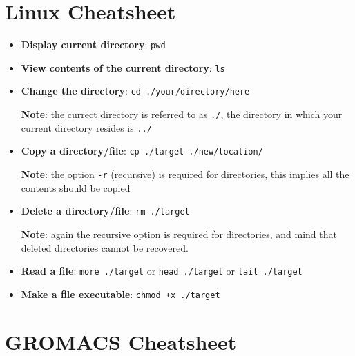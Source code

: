 \documentclass[]{article}
\begin{document}


\newpage

\appendix
\section*{Linux Cheatsheet}
\setlength\parindent{0pt}

\begin{itemize}
\item \textbf{Display current directory}: \texttt{pwd}

\item \textbf{View contents of the current directory}: \texttt{ls}

\item \textbf{Change the directory}: \texttt{cd ./your/directory/here}

\textbf{Note}: the currect directory is referred to as \texttt{./}, the directory in which your current directory resides is \texttt{../}

\item \textbf{Copy a directory/file}: \texttt{cp ./target ./new/location/}

\textbf{Note}: the option \texttt{-r} (recursive) is required for directories, this implies all the contents should be copied

\item \textbf{Delete a directory/file}: \texttt{rm ./target}

\textbf{Note}: again the recursive option is required for directories, and mind that deleted directories cannot be recovered.

\item \textbf{Read a file}: \texttt{more ./target} or \texttt{head ./target} or \texttt{tail ./target}

\item \textbf{Make a file executable}: \texttt{chmod +x ./target}
\end{itemize}

\newpage
\section*{GROMACS Cheatsheet}
\end{document}
